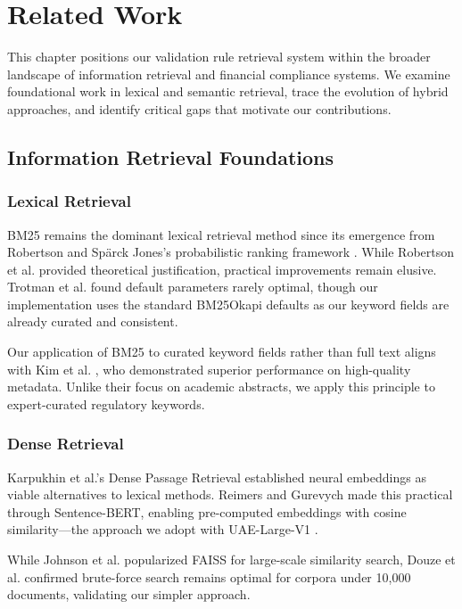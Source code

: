 \chapter{Related Work}\label{ch:related-work}

This chapter positions our validation rule retrieval system within the broader landscape of information retrieval and financial compliance systems. We examine foundational work in lexical and semantic retrieval, trace the evolution of hybrid approaches, and identify critical gaps that motivate our contributions.

\section{Information Retrieval Foundations}

\subsection{Lexical Retrieval}

BM25 remains the dominant lexical retrieval method since its emergence from Robertson and Spärck Jones's probabilistic ranking framework \cite{robertson1976relevance,robertson1994okapi}. While Robertson et al. \cite{robertson2009bm25} provided theoretical justification, practical improvements remain elusive. Trotman et al. \cite{trotman2014improvements} found default parameters rarely optimal, though our implementation uses the standard BM25Okapi defaults as our keyword fields are already curated and consistent.

Our application of BM25 to curated keyword fields rather than full text aligns with Kim et al. \cite{kim2019structured}, who demonstrated superior performance on high-quality metadata. Unlike their focus on academic abstracts, we apply this principle to expert-curated regulatory keywords.

\subsection{Dense Retrieval}

Karpukhin et al.'s Dense Passage Retrieval \cite{karpukhin2020dense} established neural embeddings as viable alternatives to lexical methods. Reimers and Gurevych \cite{reimers2019sbert} made this practical through Sentence-BERT, enabling pre-computed embeddings with cosine similarity—the approach we adopt with UAE-Large-V1 \cite{uae2023large}.

While Johnson et al. \cite{johnson2019billion} popularized FAISS for large-scale similarity search, Douze et al. \cite{douze2024faiss} confirmed brute-force search remains optimal for corpora under 10,000 documents, validating our simpler approach.

